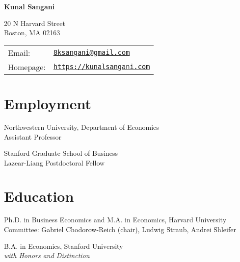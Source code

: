 \documentclass[letterpaper]{article}
\def\name{Kunal Sangani}
\begin{document}
{\Large \textbf{\name}}


\vspace{0.25in}

\begin{minipage}{0.45\linewidth}
  20 N Harvard Street  \\
  Boston, MA 02163
\end{minipage}
\begin{minipage}{0.45\linewidth}
  \begin{tabular}{ll}
    Email: & \href{mailto:8ksangani@gmail.com}{\tt 8ksangani@gmail.com} \\
    Homepage: & \href{https://kunalsangani.com}{\tt https://kunalsangani.com} \\
  \end{tabular}
\end{minipage}

\section*{Employment}
\begin{description}[labelindent=0pt, labelwidth=1in, labelsep*=1em, leftmargin =!, font=\normalfont]
\item[2025--] Northwestern University, Department of Economics\\
Assistant Professor
\item[2024--2025] Stanford Graduate School of Business\\
Lazear-Liang Postdoctoral Fellow
\end{description}

\section*{Education}
\begin{description}[labelindent=0pt, labelwidth=1in, labelsep*=1em, leftmargin =!, font=\normalfont]
\item[2019--2024] Ph.D. in Business Economics and M.A. in Economics, Harvard University\\
Committee: Gabriel Chodorow-Reich (chair), Ludwig Straub, Andrei Shleifer
\item[2012--2016] B.A. in Economics, Stanford University\\
\textit{with Honors and Distinction}
\end{description}
\end{document}
